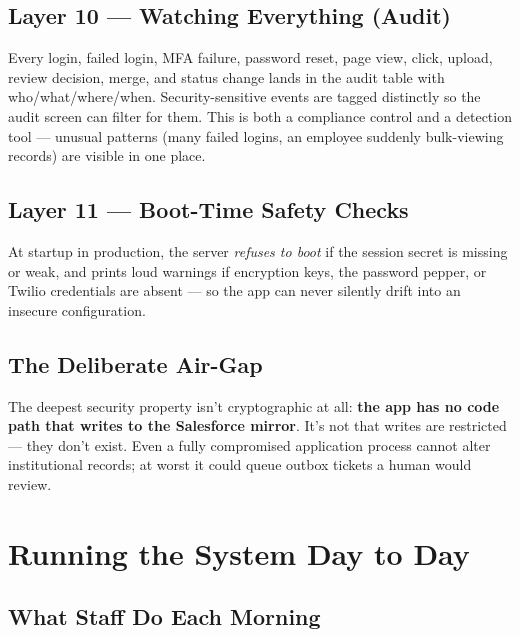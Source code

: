 \documentclass[11pt,letterpaper]{report}
\begin{document}
\section{Layer 10 --- Watching Everything (Audit)}

Every login, failed login, MFA failure, password reset, page view, click,
upload, review decision, merge, and status change lands in the audit table with
who/what/where/when. Security-sensitive events are tagged distinctly so the
audit screen can filter for them. This is both a compliance control and a
detection tool --- unusual patterns (many failed logins, an employee suddenly
bulk-viewing records) are visible in one place.

\section{Layer 11 --- Boot-Time Safety Checks}

At startup in production, the server \emph{refuses to boot} if the session
secret is missing or weak, and prints loud warnings if encryption keys, the
password pepper, or Twilio credentials are absent --- so the app can never
silently drift into an insecure configuration.

\section{The Deliberate Air-Gap}

The deepest security property isn't cryptographic at all: \textbf{the app has no
code path that writes to the Salesforce mirror}. It's not that writes are
restricted --- they don't exist. Even a fully compromised application process
cannot alter institutional records; at worst it could queue outbox tickets a
human would review.

\chapter{Running the System Day to Day}

\section{What Staff Do Each Morning}
\end{document}
